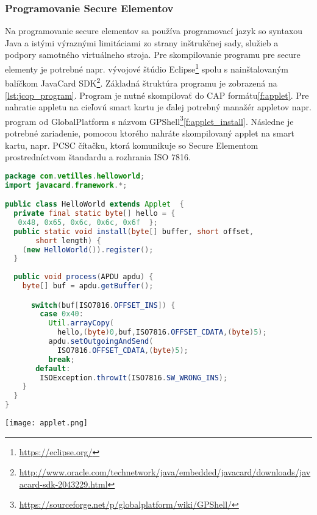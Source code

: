 \documentclass[12pt,a4paper,oneside,openright]{report}
\begin{document}
\subsubsection{Programovanie Secure Elementov}
Na programovanie secure elementov sa používa programovací jazyk so syntaxou Java a istými výraznými limitáciami zo strany inštrukčnej sady, služieb a podpory samotného virtuálneho stroja. Pre skompilovanie programu pre secure elementy je potrebné napr. vývojové štúdio Eclipse\footnote{\url{https://eclipse.org/}} spolu s nainštalovaným balíčkom JavaCard SDK\footnote{\url{http://www.oracle.com/technetwork/java/embedded/javacard/downloads/javacard-sdk-2043229.html}}.
Základná štruktúra programu je zobrazená na \ref{lst:jcop_program}. Program je nutné skompilovať do CAP formátu\ref{f:applet}.
Pre nahratie appletu na cieľovú smart kartu je ďalej potrebný manažér appletov napr. program od GlobalPlatform s názvom GPShell\footnote{\url{https://sourceforge.net/p/globalplatform/wiki/GPShell/}}\ref{f:applet_install}. Následne je potrebné zariadenie, pomocou ktorého nahráte skompilovaný applet na smart kartu, napr. PCSC čítačku, ktorá komunikuje so Secure Elementom prostredníctvom štandardu a rozhrania ISO 7816.
\begin{lstlisting}[caption={Hello World na platforme JCOP. \protect\cite{jchelloworld}}, label={lst:jcop_program}, language=java] 
package com.vetilles.helloworld;
import javacard.framework.*;

public class HelloWorld extends Applet  {
  private final static byte[] hello = {
   0x48, 0x65, 0x6c, 0x6c, 0x6f  };
  public static void install(byte[] buffer, short offset,
	   short length) {
    (new HelloWorld()).register();
  }
	
  public void process(APDU apdu) {
    byte[] buf = apdu.getBuffer(); 

      switch(buf[ISO7816.OFFSET_INS]) {
        case 0x40:
          Util.arrayCopy(
            hello,(byte)0,buf,ISO7816.OFFSET_CDATA,(byte)5);
          apdu.setOutgoingAndSend(
            ISO7816.OFFSET_CDATA,(byte)5);
          break;
       default:
        ISOException.throwIt(ISO7816.SW_WRONG_INS); 
    }
  }
}
\end{lstlisting}
\onehalfspacing

\begin{figure*}[h]
	\centering
	\texttt{[image: applet.png]}
	\caption{Kompilácia appletu do CAP formátu. \cite{javacardinstruction}}
	\label{f:applet}
\end{figure*}
\end{document}
